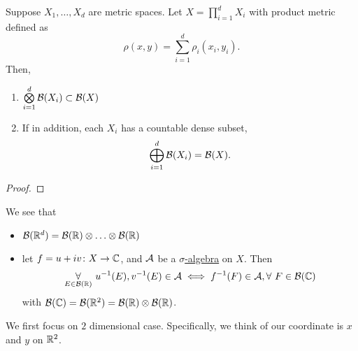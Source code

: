 \begin{theorem}
	Suppose \(X_1, \ldots , X_d \) are metric spaces. Let \(X = \prod\limits_{i=1}^{d} X_{i}\) with product metric defined as
	\[
		\rho (x, y) = \sum\limits_{i=1}^{d} \rho _{i}(x_{i}, y_{i}).
	\]
	Then,
	\begin{enumerate}[(1)]
		\item \(\bigotimes\limits_{i=1}^{d}\mathcal{\MakeUppercase{b}} (X_{i})\subset \mathcal{\MakeUppercase{b}} (X)\)
		\item If in addition, each \(X_{i}\) has a countable dense subset,
		      \[
			      \bigoplus\limits_{i=1}^{d}\mathcal{\MakeUppercase{b}} (X_{i}) = \mathcal{\MakeUppercase{b}} (X).
		      \]
	\end{enumerate}
\end{theorem}
\begin{proof}
\end{proof}

\begin{remark}
	We see that
	\begin{itemize}
		\item \(\mathcal{\MakeUppercase{b}} (\mathbb{\MakeUppercase{r}} ^d) = \mathcal{\MakeUppercase{b}} (\mathbb{\MakeUppercase{r}} )\otimes \ldots \otimes \mathcal{\MakeUppercase{b}} (\mathbb{\MakeUppercase{r}} ) \)
		\item let \(f = u + iv\colon X\to \mathbb{\MakeUppercase{c}} \), and \(\mathcal{\MakeUppercase{a}} \) be a \hyperref[def:sigma-algebra]{\(\sigma\)-algebra} on \(X\). Then
		      \[
			      \underset{E\in \mathcal{\MakeUppercase{b}} (\mathbb{\MakeUppercase{r}} )}{\forall }\ u^{-1} (E), v^{-1} (E)\in \mathcal{\MakeUppercase{a}}
			      \iff
			      f^{-1} (F)\in \mathcal{\MakeUppercase{a}}, \forall\ F\in \mathcal{\MakeUppercase{b}} (\mathbb{\MakeUppercase{c}} )
		      \]
		      with \(\mathcal{\MakeUppercase{b}} (\mathbb{\MakeUppercase{c}} ) = \mathcal{\MakeUppercase{b}} (\mathbb{\MakeUppercase{r}} ^2) = \mathcal{\MakeUppercase{b}} (\mathbb{\MakeUppercase{r}} )\otimes \mathcal{\MakeUppercase{b}} (\mathbb{\MakeUppercase{r}} )\).
	\end{itemize}
\end{remark}

We first focus on \(2\) dimensional case. Specifically, we think of our coordinate is \(x\) and \(y\) on \(\mathbb{\MakeUppercase{r}} ^2\).

